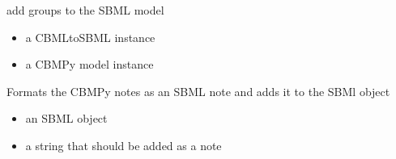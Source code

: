 \documentclass[letterpaper,10pt,english]{sphinxmanual}
\begin{document}
\begin{fulllineitems}
\label{\detokenize{modules_doc:cbmpy.CBXML.sbml_setGroupsL3}}
\pysigstartsignatures
{}
\pysigstopsignatures
\sphinxAtStartPar
add groups to the SBML model
\begin{itemize}
\item {} 
\sphinxAtStartPar
{} a CBMLtoSBML instance

\item {} 
\sphinxAtStartPar
{} a CBMPy model instance

\end{itemize}

\end{fulllineitems}


\begin{fulllineitems}
\label{\detokenize{modules_doc:cbmpy.CBXML.sbml_setNotes3}}
\pysigstartsignatures
{}
\pysigstopsignatures
\sphinxAtStartPar
Formats the CBMPy notes as an SBML note and adds it to the SBMl object
\begin{itemize}
\item {} 
\sphinxAtStartPar
{} an SBML object

\item {} 
\sphinxAtStartPar
{} a string that should be added as a note

\end{itemize}

\end{fulllineitems}

\end{document}
